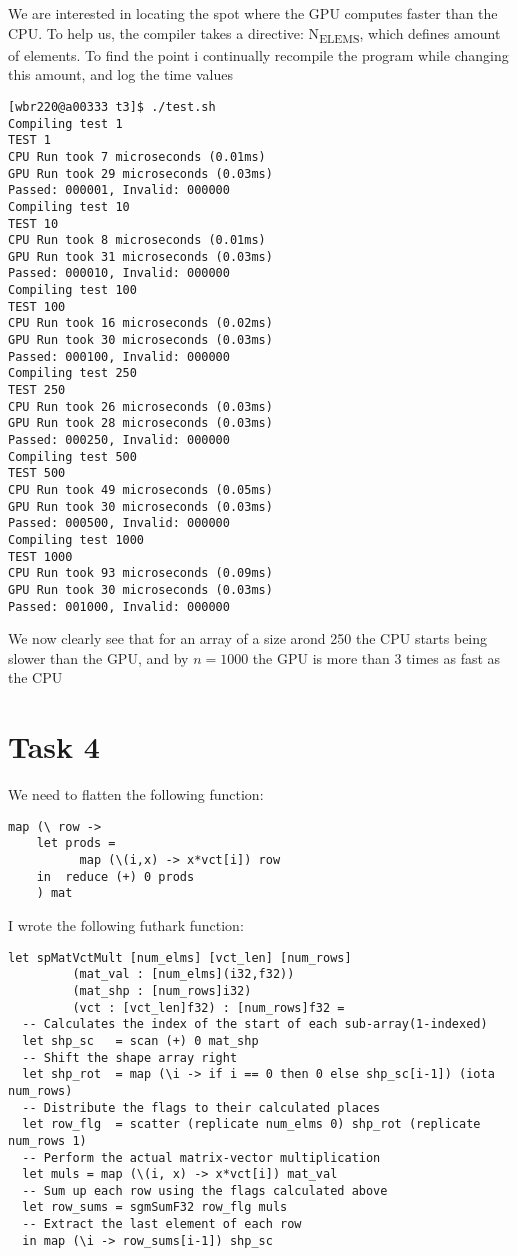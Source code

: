 \documentclass[11pt]{article}
\begin{document}
We are interested in locating the spot where the GPU computes faster than the CPU. To
help us, the compiler takes a directive: N\textsubscript{ELEMS}, which defines amount of elements. To
find the point i continually recompile the program while changing this amount, and log the
time values
\begin{verbatim}
[wbr220@a00333 t3]$ ./test.sh
Compiling test 1
TEST 1
CPU Run took 7 microseconds (0.01ms)
GPU Run took 29 microseconds (0.03ms)
Passed: 000001, Invalid: 000000
Compiling test 10
TEST 10
CPU Run took 8 microseconds (0.01ms)
GPU Run took 31 microseconds (0.03ms)
Passed: 000010, Invalid: 000000
Compiling test 100
TEST 100
CPU Run took 16 microseconds (0.02ms)
GPU Run took 30 microseconds (0.03ms)
Passed: 000100, Invalid: 000000
Compiling test 250
TEST 250
CPU Run took 26 microseconds (0.03ms)
GPU Run took 28 microseconds (0.03ms)
Passed: 000250, Invalid: 000000
Compiling test 500
TEST 500
CPU Run took 49 microseconds (0.05ms)
GPU Run took 30 microseconds (0.03ms)
Passed: 000500, Invalid: 000000
Compiling test 1000
TEST 1000
CPU Run took 93 microseconds (0.09ms)
GPU Run took 30 microseconds (0.03ms)
Passed: 001000, Invalid: 000000
\end{verbatim}

We now clearly see that for an array of a size arond 250 the CPU starts being slower than
the GPU, and by \(n = 1000\) the GPU is more than 3 times as fast as the CPU

\section{Task 4}
\label{sec:org1fe6cd4}
We need to flatten the following function:
\begin{verbatim}
map (\ row ->                             
	let prods =                       
	      map (\(i,x) -> x*vct[i]) row
	in  reduce (+) 0 prods            
    ) mat                                 
\end{verbatim}

I wrote the following futhark function:
\begin{verbatim}
let spMatVctMult [num_elms] [vct_len] [num_rows] 
		 (mat_val : [num_elms](i32,f32))
		 (mat_shp : [num_rows]i32)
		 (vct : [vct_len]f32) : [num_rows]f32 =
  -- Calculates the index of the start of each sub-array(1-indexed)
  let shp_sc   = scan (+) 0 mat_shp
  -- Shift the shape array right
  let shp_rot  = map (\i -> if i == 0 then 0 else shp_sc[i-1]) (iota num_rows)
  -- Distribute the flags to their calculated places
  let row_flg  = scatter (replicate num_elms 0) shp_rot (replicate num_rows 1)
  -- Perform the actual matrix-vector multiplication
  let muls = map (\(i, x) -> x*vct[i]) mat_val
  -- Sum up each row using the flags calculated above
  let row_sums = sgmSumF32 row_flg muls
  -- Extract the last element of each row
  in map (\i -> row_sums[i-1]) shp_sc
\end{verbatim}
\end{document}
